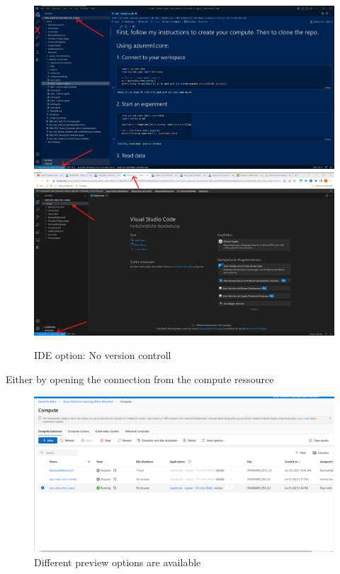 \begin{figure}[H]
	\centering
	\includegraphics[scale = 0.1]{attachment/chapter_10/Scc048}\\
	\includegraphics[scale = 0.1]{attachment/chapter_10/Scc049}
	\caption{IDE option: No version controll}
\end{figure}

Either by opening the connection from the compute ressource
 \begin{figure}[H]
 	\centering
 	\includegraphics[scale = 0.3]{attachment/chapter_10/Scc046}
 	\caption{Different preview options are available}
 \end{figure}

